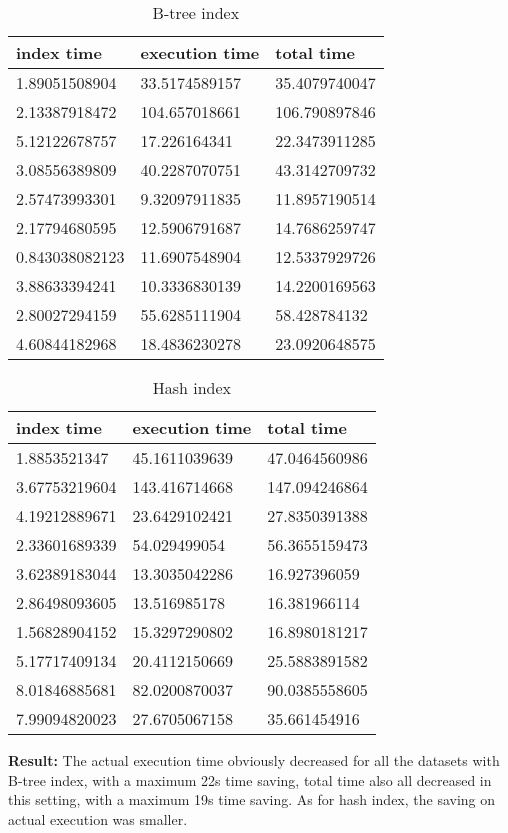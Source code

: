\begin{itemize*}
\begin{table}[H]
\begin{center}
\begin{tabular}{|l|l|l|}
\hline
index time & execution time & total time                \\ \hline
1.89051508904  & 33.5174589157 & 35.4079740047 \\ \hline
2.13387918472  & 104.657018661 & 106.790897846 \\ \hline
5.12122678757  & 17.226164341  & 22.3473911285 \\ \hline
3.08556389809  & 40.2287070751 & 43.3142709732 \\ \hline
2.57473993301  & 9.32097911835 & 11.8957190514 \\ \hline
2.17794680595  & 12.5906791687 & 14.7686259747 \\ \hline
0.843038082123 & 11.6907548904 & 12.5337929726 \\ \hline
3.88633394241  & 10.3336830139 & 14.2200169563 \\ \hline
2.80027294159  & 55.6285111904 & 58.428784132  \\ \hline
4.60844182968  & 18.4836230278 & 23.0920648575 \\ \hline
\end{tabular}
\end{center}
\caption{B-tree index}
\end{table}

\begin{table}[H]
\begin{center}
\begin{tabular}{|l|l|l|}
\hline
index time & execution time & total time     \\ \hline
1.8853521347  & 45.1611039639 & 47.0464560986 \\ \hline
3.67753219604 & 143.416714668 & 147.094246864 \\ \hline
4.19212889671 & 23.6429102421 & 27.8350391388 \\ \hline
2.33601689339 & 54.029499054  & 56.3655159473 \\ \hline
3.62389183044 & 13.3035042286 & 16.927396059  \\ \hline
2.86498093605 & 13.516985178  & 16.381966114  \\ \hline
1.56828904152 & 15.3297290802 & 16.8980181217 \\ \hline
5.17717409134 & 20.4112150669 & 25.5883891582 \\ \hline
8.01846885681 & 82.0200870037 & 90.0385558605 \\ \hline
7.99094820023 & 27.6705067158 & 35.661454916  \\ \hline
\end{tabular}
\end{center}
\caption{Hash index}
\end{table}

\par \textbf{Result:}  The actual execution time obviously decreased for all the datasets with B-tree index, with a maximum 22s time saving, total time also all decreased in this setting, with a maximum 19s time saving. As for hash index, the saving on actual execution was smaller.
\end{itemize*}
